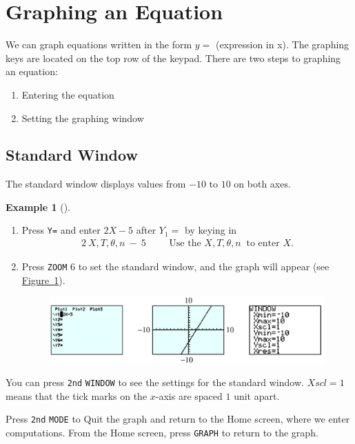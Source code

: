 \documentclass[10pt,]{book}
\theoremstyle{plain}
\theoremstyle{definition}
\theoremstyle{definition}
\newtheorem{example}[theorem]{Example}
\theoremstyle{definition}
\numberwithin{equation}{part}
\newcommand{\amp}{&}
\begin{document}
\section[{Graphing an Equation}]{Graphing an Equation}\label{appendix-Graphing-an-Equation}
We can graph equations written in the form \(y = \) (expression in x). The graphing keys are located on the top row of the keypad. There are two steps to graphing an equation: \leavevmode%
\begin{enumerate}[label=*\arabic**]
\item\hypertarget{li-411}{}Entering the equation%
\item\hypertarget{li-412}{}Setting the graphing window%
\end{enumerate}
%
\typeout{************************************************}
\typeout{************************************************}
\subsection[{Standard Window}]{Standard Window}\label{subsection-76}
The standard window displays values from \(−10\) to \(10\) on both axes.%
\begin{example}[]\label{example-115}
\leavevmode%
\begin{enumerate}[label=*\arabic**]
\item\hypertarget{li-413}{}Press \lstinline?Y=? and enter \(2X-5\) after \(Y_1=\) by keying in%
\begin{align*}
2~ \boxed{X, T, \theta, n} ~ \boxed{{}-{}} ~ 5 \amp\amp\amp\text{Use the } \boxed{X, T, \theta, n} ~ \text{ to enter }X.
\end{align*}
%
\item\hypertarget{li-414}{}Press  \lstinline?ZOOM? \(6\) to set the standard window, and the graph will appear (see \hyperref[fig-GC-graphing-windows]{Figure~\ref{fig-GC-graphing-windows}}). \leavevmode%
\begin{figure}
\centering
\includegraphics[width=1\linewidth]{images/fig-GC-graphing-windows.jpg}
\caption{\label{fig-GC-graphing-windows}}
\end{figure}
%
\end{enumerate}
 You can press \lstinline?2nd? \lstinline?WINDOW? to see the settings for the standard window. \(Xscl = 1\) means that the tick marks on the \(x\)-axis are spaced \(1\) unit apart.%
\par
Press \lstinline?2nd? \lstinline?MODE? to Quit the graph and return to the Home screen, where we enter computations. From the Home screen, press \lstinline?GRAPH? to return to the graph.%
\end{example}
\typeout{************************************************}
\typeout{************************************************}
\end{document}
